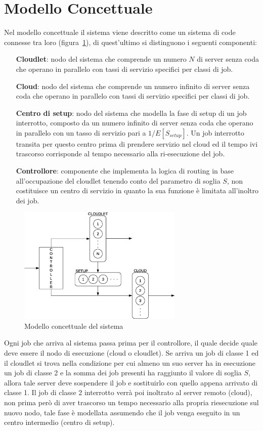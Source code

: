 \section{Modello Concettuale}
Nel modello concettuale il sistema viene descritto come un sistema di code
connesse tra loro (figura~\ref{conceptual}), di quest'ultimo si distinguono i
seguenti componenti:
\begin{itemize}
\item[\textbf{Cloudlet}:] nodo del sistema che comprende un numero $N$ di server
senza coda che operano in parallelo con tassi di servizio specifici per classi
di job.
\item[\textbf{Cloud}:] nodo del sistema che comprende un numero infinito di
server senza coda che operano in parallelo con tassi di servizio specifici per
classi di job.
\item[\textbf{Centro di setup}:] nodo del sistema che modella la fase di setup
di un job interrotto, composto da un numero infinito di server senza coda che
operano in parallelo con un tasso di servizio pari a $1/E[S_{setup}]$. Un job
interrotto transita per questo centro prima di prendere servizio nel cloud ed il
tempo ivi trascorso corrisponde al tempo necessario alla ri-esecuzione del job.
\item[\textbf{Controllore}:] componente che implementa la logica di routing in
base all’occupazione del cloudlet tenendo conto del parametro di soglia $S$, non
costituisce un centro di servizio in quanto la sua funzione è limitata
all'inoltro dei job.
\end{itemize} 
%
\begin{figure}[!h]
\centering
\includegraphics[width=0.7\textwidth]{figures/conceptual}
\caption{Modello concettuale del sistema}
\label{conceptual}
\end{figure}
%
Ogni job che arriva al sistema passa prima per il controllore, il quale decide
quale deve essere il nodo di esecuzione (cloud o cloudlet). Se arriva un job di
classe 1 ed il cloudlet si trova nella condizione per cui almeno un suo server
ha in esecuzione un job di classe 2 e la somma dei job presenti ha raggiunto il
valore di soglia $S$, allora tale server deve sospendere il job e sostituirlo con
quello appena arrivato di classe 1. Il job di classe 2 interrotto verrà poi
inoltrato al server remoto (cloud), non prima però di aver trascorso un tempo
necessario alla propria riesecuzione sul nuovo nodo, tale fase è modellata
assumendo che il job venga eseguito in un centro intermedio (centro di setup).
